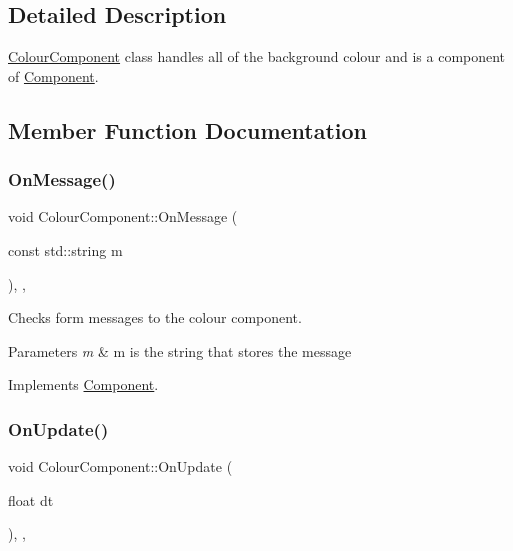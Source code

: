 \subsection{Detailed Description}
\mbox{\hyperlink{class_colour_component}{Colour\+Component}} class handles all of the background colour and is a component of \mbox{\hyperlink{class_component}{Component}}. 

\subsection{Member Function Documentation}
\mbox{\label{class_colour_component_a40b859f0c124ddbe92ff1e53bdb398a0}} 
\subsubsection{\texorpdfstring{OnMessage()}{OnMessage()}}
{\footnotesize\ttfamily void Colour\+Component\+::\+On\+Message (\begin{DoxyParamCaption}\item[{const std\+::string}]{m }\end{DoxyParamCaption})\hspace{0.3cm}{\ttfamily [inline]}, {\ttfamily [override]}, {\ttfamily [virtual]}}



Checks form messages to the colour component. 


\begin{DoxyParams}{Parameters}
{\em m} & m is the string that stores the message \\
\hline
\end{DoxyParams}


Implements \mbox{\hyperlink{class_component_a1a880fe5e212cd7ef8241e220660417d}{Component}}.

\mbox{\label{class_colour_component_ae45e91aebb680031bb1328c7c189ea15}} 
\subsubsection{\texorpdfstring{OnUpdate()}{OnUpdate()}}
{\footnotesize\ttfamily void Colour\+Component\+::\+On\+Update (\begin{DoxyParamCaption}\item[{float}]{dt }\end{DoxyParamCaption})\hspace{0.3cm}{\ttfamily [inline]}, {\ttfamily [override]}, {\ttfamily [virtual]}}



